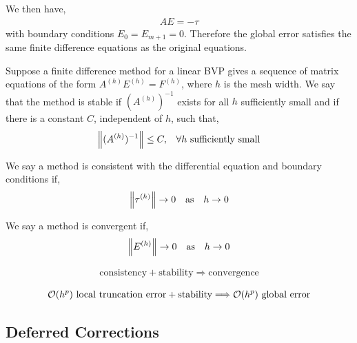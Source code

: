 \documentclass[12pt]{article}
\begin{document}
We then have,
\begin{align*}
    AE = -\tau
\end{align*}
with boundary conditions \( E_0 = E_{m+1}=0 \). Therefore the global error satisfies the same finite difference equations as the original equations.

\begin{definition}[Stable]
Suppose a finite difference method for a linear BVP gives a sequence of matrix equations of the form \( A^{(h)} E^{(h)} = F^{(h)} \), where \( h \) is the mesh width. We say that the method is stable if \( (A^{(h)})^{-1} \) exists for all \( h \) sufficiently small and if there is a constant \( C \), independent of \( h \), such that,
\begin{align*}
    \left\lVert(A^{(h)})^{-1}\right\rVert \leq C, && \forall h \text{ sufficiently small}
\end{align*}
\end{definition}

\begin{definition}[Consistency]
We say a method is consistent with the differential equation and boundary conditions if,
\begin{align*}
    \left\lVert\tau^{(h)}\right\rVert\to 0 && \text{as} && h\to 0
\end{align*}
\end{definition}

\begin{definition}[Convergence]
We say a method is convergent if,
\begin{align*}
    \left\lVert E^{(h)}\right\rVert\to 0 && \text{as} && h\to 0
\end{align*}
\end{definition}

\begin{theorem}
\vspace{-1em}
\begin{align*}
    \text{consistency} + \text{stability} \Longrightarrow \text{convergence} \\
\end{align*} \vspace{-4em}
\begin{align*}
    \mathcal{O}(h^p) \text{ local truncation error} + \text{stability} \Longrightarrow \mathcal{O}(h^p) \text{ global error}
\end{align*}
\end{theorem}

\subsection{Deferred Corrections}
\end{document}
